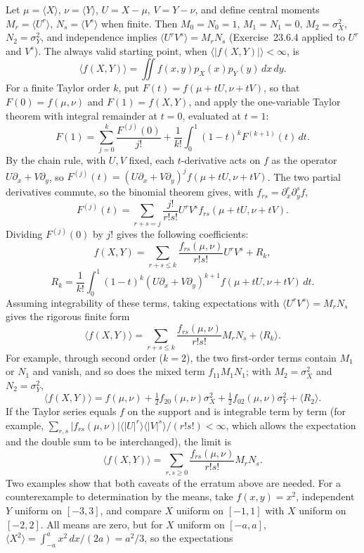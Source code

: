 Let $\mu=\langle X\rangle$, $\nu=\langle Y\rangle$,
$U=X-\mu$, $V=Y-\nu$, and define central moments
$M_r=\langle U^r\rangle$, $N_s=\langle V^s\rangle$ when finite.
Then $M_0=N_0=1$, $M_1=N_1=0$, $M_2=\sigma_X^2$, $N_2=\sigma_Y^2$, and
independence implies $\langle U^rV^s\rangle=M_rN_s$
(Exercise~23.6.4 applied to $U^r$ and $V^s$). The always valid starting
point, when $\langle|f(X,Y)|\rangle<\infty$, is
\[
\langle f(X,Y)\rangle=\iint f(x,y)p_X(x)p_Y(y)\,dx\,dy.
\]
For a finite Taylor order $k$, put $F(t)=f(\mu+tU,\nu+tV)$, so that
$F(0)=f(\mu,\nu)$ and $F(1)=f(X,Y)$, and apply the one-variable Taylor
theorem with integral remainder at $t=0$, evaluated at $t=1$:
\[
F(1)=\sum_{j=0}^k\frac{F^{(j)}(0)}{j!}
+\frac1{k!}\int_0^1(1-t)^kF^{(k+1)}(t)\,dt.
\]
By the chain rule, with $U,V$ fixed, each $t$-derivative acts on $f$ as
the operator $U\partial_x+V\partial_y$, so
$F^{(j)}(t)=(U\partial_x+V\partial_y)^jf(\mu+tU,\nu+tV)$. The two
partial derivatives commute, so the binomial theorem gives, with
$f_{rs}=\partial_x^r\partial_y^sf$,
\[
 F^{(j)}(t)=\sum_{r+s=j}\frac{j!}{r!s!}U^rV^s
 f_{rs}(\mu+tU,\nu+tV).
\]
Dividing $F^{(j)}(0)$ by $j!$ gives the following coefficients:
\[
f(X,Y)=\sum_{r+s\le k}\frac{f_{rs}(\mu,\nu)}{r!s!}U^rV^s+R_k,
\]
\[
R_k=\frac1{k!}\int_0^1(1-t)^k
 (U\partial_x+V\partial_y)^{k+1}
 f(\mu+tU,\nu+tV)\,dt.
\]
Assuming integrability of these terms, taking expectations with
$\langle U^rV^s\rangle=M_rN_s$ gives the rigorous finite form
\[
\boxed{\langle f(X,Y)\rangle
=\sum_{r+s\le k}\frac{f_{rs}(\mu,\nu)}{r!s!}M_rN_s+\langle R_k\rangle}.
\]
For example, through second order ($k=2$), the two first-order terms
contain $M_1$ or $N_1$ and vanish, and so does the mixed term
$f_{11}M_1N_1$; with $M_2=\sigma_X^2$ and $N_2=\sigma_Y^2$,
\[
\langle f(X,Y)\rangle
=f(\mu,\nu)+\tfrac12f_{20}(\mu,\nu)\sigma_X^2
+\tfrac12f_{02}(\mu,\nu)\sigma_Y^2+\langle R_2\rangle.
\]
If the Taylor series equals
$f$ on the support and is integrable term by term (for example,
$\sum_{r,s}|f_{rs}(\mu,\nu)|\langle|U|^r\rangle
\langle|V|^s\rangle/(r!s!)<\infty$, which allows the expectation and
the double sum to be interchanged), the limit is
\[
\langle f(X,Y)\rangle=\sum_{r,s\ge0}
\frac{f_{rs}(\mu,\nu)}{r!s!}M_rN_s.
\]
Two examples show that both caveats of the erratum above are needed.
For a counterexample to determination
by the means, take $f(x,y)=x^2$, independent $Y$ uniform on $[-3,3]$,
and compare $X$ uniform on $[-1,1]$ with $X$ uniform on $[-2,2]$.
All means are zero, but for $X$ uniform on $[-a,a]$,
$\langle X^2\rangle=\int_{-a}^ax^2\,dx/(2a)=a^2/3$, so the expectations
